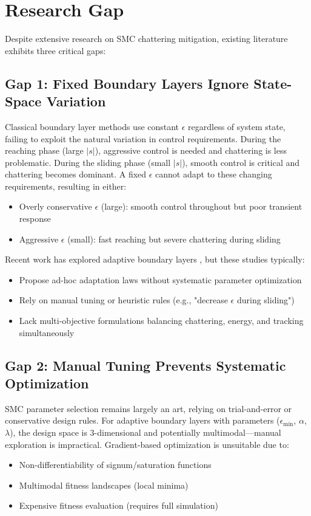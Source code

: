 \section{Research Gap}
\label{sec:research_gap}

Despite extensive research on SMC chattering mitigation, existing literature exhibits three critical gaps:

\subsection{Gap 1: Fixed Boundary Layers Ignore State-Space Variation}

Classical boundary layer methods use constant $\epsilon$ regardless of system state, failing to exploit the natural variation in control requirements. During the reaching phase (large $|s|$), aggressive control is needed and chattering is less problematic. During the sliding phase (small $|s|$), smooth control is critical and chattering becomes dominant. A fixed $\epsilon$ cannot adapt to these changing requirements, resulting in either:
\begin{itemize}
    \item Overly conservative $\epsilon$ (large): smooth control throughout but poor transient response
    \item Aggressive $\epsilon$ (small): fast reaching but severe chattering during sliding
\end{itemize}

Recent work has explored adaptive boundary layers \cite{plestan2010new, bartoszewicz2007reaching}, but these studies typically:
\begin{itemize}
    \item Propose ad-hoc adaptation laws without systematic parameter optimization
    \item Rely on manual tuning or heuristic rules (e.g., "decrease $\epsilon$ during sliding")
    \item Lack multi-objective formulations balancing chattering, energy, and tracking simultaneously
\end{itemize}

\subsection{Gap 2: Manual Tuning Prevents Systematic Optimization}

SMC parameter selection remains largely an art, relying on trial-and-error or conservative design rules. For adaptive boundary layers with parameters ($\epsilon_{\min}$, $\alpha$, $\lambda$), the design space is 3-dimensional and potentially multimodal—manual exploration is impractical. Gradient-based optimization is unsuitable due to:
\begin{itemize}
    \item Non-differentiability of signum/saturation functions
    \item Multimodal fitness landscapes (local minima)
    \item Expensive fitness evaluation (requires full simulation)
\end{itemize}

